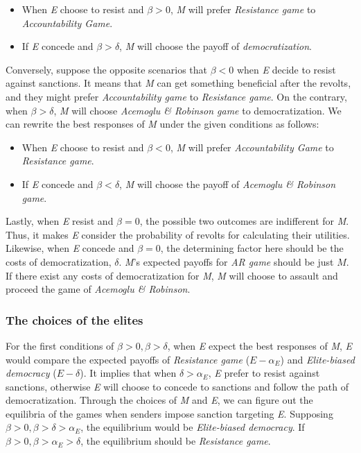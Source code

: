 \documentclass[11pt, letterpage, titlepage]{article}
\begin{document}
\begin{itemize}
	\item When \textit{E} choose to resist and $\beta > 0$, \textit{M} will prefer \textit{Resistance game} to \textit{Accountability Game}.
	\item If \textit{E} concede and $\beta > \delta$, \textit{M} will choose the payoff of \textit{democratization}.
\end{itemize}
	
Conversely, suppose the opposite scenarios that $\beta < 0$ when \textit{E} decide to resist against sanctions. It means that \textit{M} can get something beneficial after the revolts, and they might prefer \textit{Accountability game} to \textit{Resistance game}. On the contrary, when $\beta > \delta$, \textit{M} will choose \textit{Acemoglu \& Robinson game} to democratization. We can rewrite the best responses of \textit{M} under the given conditions as follows:

\begin{itemize}
	\item When \textit{E} choose to resist and $\beta < 0$, \textit{M} will prefer \textit{Accountability Game} to \textit{Resistance game}.
	\item If \textit{E} concede and $\beta < \delta$, \textit{M} will choose the payoff of \textit{Acemoglu \& Robinson game}.
\end{itemize}
	
Lastly, when \textit{E} resist and $\beta = 0$, the possible two outcomes are indifferent for \textit{M}. Thus, it makes \textit{E} consider the probability of revolts for calculating their utilities. Likewise, when \textit{E} concede and $\beta = 0$, the determining factor here should be the costs of democratization, $\delta$. \textit{M}'s expected payoffs for \textit{AR game} should be just $M$. If there exist any costs of democratization for \textit{M}, \textit{M} will choose to assault and proceed the game of \textit{Acemoglu \& Robinson}. 
	
\subsubsection*{The choices of the elites}
	
For the first conditions of $\beta > 0, \beta > \delta$, when \textit{E} expect the best responses of \textit{M}, \textit{E} would compare the expected payoffs of \textit{Resistance game} ($E-\alpha_{E}$) and \textit{Elite-biased democracy} ($E-\delta$). It implies that when $\delta > \alpha_{E}$, \textit{E} prefer to resist against sanctions, otherwise \textit{E} will choose to concede to sanctions and follow the path of democratization. Through the choices of \textit{M} and \textit{E}, we can figure out the equilibria of the games when senders impose sanction targeting \textit{E}. Supposing $\beta > 0, \beta > \delta > \alpha_{E}$, the equilibrium would be \textit{Elite-biased democracy}. If $\beta > 0, \beta > \alpha_{E} > \delta$, the equilibrium should be \textit{Resistance game}.
	
\end{document}
